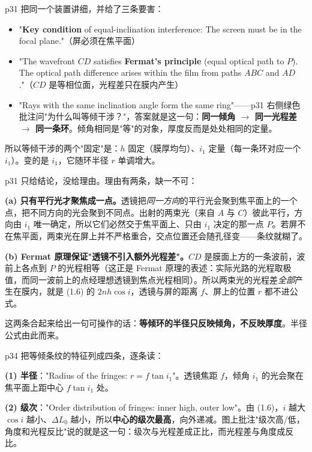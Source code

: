 \documentclass[10pt]{ctexart}
\begin{document}
p31 把同一个装置讲细，并给了三条要害：
\begin{itemize}
\item "\textbf{Key condition} of equal-inclination interference: The screen must be in the focal plane."（屏必须在焦平面）
\item "The wavefront $CD$ satisfies \textbf{Fermat's principle} (equal optical path to $P$). The optical path difference arises within the film from paths $ABC$ and $AD$."（$CD$ 是等相位面，光程差只在膜内产生）
\item "Rays with the same inclination angle form the same ring"——p31 右侧绿色批注问"为什么叫等倾干涉？"，答案就是这一句：\textbf{同一倾角 $\to$ 同一光程差 $\to$ 同一条环}。倾角相同是"等"的对象，厚度反而是处处相同的定量。
\end{itemize}

所以等倾干涉的两个"固定"是：$h$ 固定（膜厚均匀）、$i_1$ 定量（每一条环对应一个 $i_1$）。变的是 $i_1$，它随环半径 $r$ 单调增大。


p31 只给结论，没给理由。理由有两条，缺一不可：

\textbf{(a) 只有平行光才聚焦成一点。}透镜把\emph{同一方向}的平行光会聚到焦平面上的一个点，把不同方向的光会聚到不同点。出射的两束光（来自 $A$ 与 $C$）彼此平行，方向由 $i_1$ 唯一确定，所以它们必然交于焦平面上、只由 $i_1$ 决定的那一点 $P$。若屏不在焦平面，两束光在屏上并不严格重合，交点位置还会随孔径变——条纹就糊了。

\textbf{(b) Fermat 原理保证"透镜不引入额外光程差"。}$CD$ 是膜面上方的一条波前，波前上各点到 $P$ 的光程相等（这正是 Fermat 原理的表述：实际光路的光程取极值，而同一波前上的点经理想透镜到焦点光程相同）。所以两束光的光程差\emph{全部}产生在膜内，就是 (1.6) 的 $2nh\cos i$，透镜与屏的距离 $f$、屏上的位置 $r$ 都不进公式。

这两条合起来给出一句可操作的话：\textbf{等倾环的半径只反映倾角，不反映厚度}。半径公式由此而来。


p34 把等倾条纹的特征列成四条，逐条读：

\textbf{(1) 半径}："Radius of the fringes: $r=f\tan i_1$"。透镜焦距 $f$，倾角 $i_1$ 的光会聚在焦平面上距中心 $f\tan i_1$ 处。

\textbf{(2) 级次}："Order distribution of fringes: inner high, outer low"。由 (1.6)，$i$ 越大 $\cos i$ 越小、$\Delta L_0$ 越小，所以\textbf{中心的级次最高}，向外递减。图上批注"级次高/低，角度和光程反比"说的就是这一句：级次与光程差成正比，而光程差与角度成反比。
\end{document}
